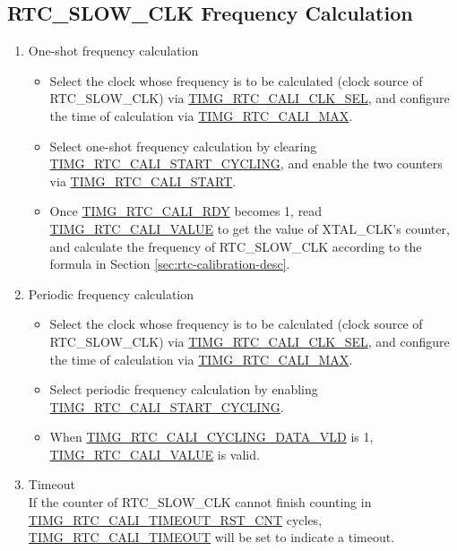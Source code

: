 \documentclass[main\_\_EN.tex]{subfiles}
\begin{document}
\subsection{RTC\_SLOW\_CLK Frequency Calculation}\label{sec:rtc-calibration-procedure}
\begin{enumerate}
    \item One-shot frequency calculation
    \begin{itemize}
        \item Select the clock whose frequency is to be calculated (clock source of RTC\_SLOW\_CLK) via \hyperref[fielddesc:TIMGRTCCALICLKSEL]{TIMG\_RTC\_CALI\_CLK\_SEL}, and configure the time of calculation via \hyperref[fielddesc:TIMGRTCCALIMAX]{TIMG\_RTC\_CALI\_MAX}.
        \item Select one-shot frequency calculation by clearing \hyperref[fielddesc:TIMGRTCCALISTARTCYCLING]{TIMG\_RTC\_CALI\_START\_CYCLING}, and enable the two counters via \hyperref[fielddesc:TIMGRTCCALISTART]{TIMG\_RTC\_CALI\_START}.
        \item Once \hyperref[fielddesc:TIMGRTCCALIRDY]{TIMG\_RTC\_CALI\_RDY} becomes 1, read \hyperref[fielddesc:TIMGRTCCALIVALUE]{TIMG\_RTC\_CALI\_VALUE} to get the value of XTAL\_CLK's counter, and calculate the frequency of RTC\_SLOW\_CLK according to the formula in Section \ref{sec:rtc-calibration-desc}.
    \end{itemize}
    \item Periodic frequency calculation
    \begin{itemize}
        \item Select the clock whose frequency is to be calculated (clock source of RTC\_SLOW\_CLK) via \hyperref[fielddesc:TIMGRTCCALICLKSEL]{TIMG\_RTC\_CALI\_CLK\_SEL}, and configure the time of calculation via \hyperref[fielddesc:TIMGRTCCALIMAX]{TIMG\_RTC\_CALI\_MAX}.
        \item Select periodic frequency calculation by enabling \hyperref[fielddesc:TIMGRTCCALISTARTCYCLING]{TIMG\_RTC\_CALI\_START\_CYCLING}.
        \item When \hyperref[fielddesc:TIMGRTCCALICYCLINGDATAVLD]{TIMG\_RTC\_CALI\_CYCLING\_DATA\_VLD} is 1, \hyperref[fielddesc:TIMGRTCCALIVALUE]{TIMG\_RTC\_CALI\_VALUE} is valid.
    \end{itemize}
    \item Timeout\\
    If the counter of RTC\_SLOW\_CLK cannot finish counting in \hyperref[fielddesc:TIMGRTCCALITIMEOUTRSTCNT]{TIMG\_RTC\_CALI\_TIMEOUT\_RST\_CNT} cycles,  \\\hyperref[fielddesc:TIMGRTCCALITIMEOUT]{TIMG\_RTC\_CALI\_TIMEOUT} will be set to indicate a timeout.
\end{enumerate}
\end{document}
